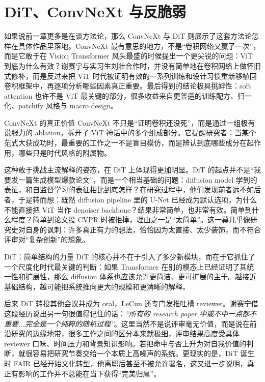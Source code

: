 \section{DiT、ConvNeXt 与反脆弱}

如果说前一章更多是在谈方法论，那么 ConvNeXt 与 DiT 则展示了这套方法论怎样在具体作品里落地。ConvNeXt 最有意思的地方，不是“卷积网络又赢了一次”，而是它敢于在 Vision Transformer 风头最盛的时候提出一个更尖锐的问题：ViT 到底为什么有效？谢赛宁与实习生刘壮合作时，并没有简单地在卷积网络上做怀旧式修补，而是反过来把 ViT 时代被证明有效的一系列训练和设计习惯重新移植回卷积框架中，再逐项分析哪些因素真正重要。最后得到的结论极具挑衅性：soft attention 也许不是 ViT 最关键的部分，很多收益来自更普适的训练配方、归一化、patchify 风格与 macro design。

\begin{knowledgebox}{ConvNeXt 的真正价值}
ConvNeXt 不只是“证明卷积还没死”，而是通过一组极有说服力的 ablation，拆开了 ViT 神话中的多个组成部分。它提醒研究者：当某个范式大获成功时，最重要的工作之一不是盲目模仿，而是辨认到底哪些成分在起作用，哪些只是时代风格的附属物。
\end{knowledgebox}

这种敢于挑战主流解释的姿态，在 DiT 上体现得更加明显。DiT 的起点并不是“我要发一篇生成模型爆款论文”，而是一个相当基础的问题：diffusion model 学到的表征，和自监督学习的表征相比到底怎样？在研究过程中，他们发现前者远不如后者，于是转而想：既然 diffusion pipeline 里的 U-Net 已经成为默认选项，为什么不能直接把 ViT 当作 denoiser backbone？结果非常简单，也非常有效。简单到什么程度？简单到论文投 CVPR 时被拒掉，理由之一是“太简单”。这一幕几乎像研究史对自身的讽刺：许多真正有力的想法，恰恰因为太直接、太少装饰，而不符合评审对“复杂创新”的想象。

\begin{importantbox}{DiT：简单结构的力量}
DiT 的核心并不在于引入了多少新模块，而在于它抓住了一个尺度化时代最关键的判断：如果 Transformer 在别的模态上已经证明了其统一性和扩展性，那么 diffusion 体系也应该允许更简洁、更可扩展的主干。越接近基础结构，越可能把系统推向更大的规模和更清晰的解释。
\end{importantbox}

后来 DiT 转投其他会议并成为 oral，LeCun 还专门发推吐槽 reviewer。谢赛宁借这段经历说出另一句很值得记住的话：\textit{``所有的 research paper 中或不中一点都不重要...完全是一个纯粹的随机过程''}。这里当然不是说评审毫无价值，而是说在前沿研究的边缘地带，很多工作之间的区分本来就极细，评审结果高度受具体 reviewer 口味、时间压力和背景知识影响。若把命中与否上升为对自我价值的判断，就很容易把研究节奏交给一个本质上高噪声的系统。更现实的是，DiT 诞生时 FAIR 已经开始文化转型，他离职后甚至不被允许署名，这又进一步说明，真正有影响的工作并不总能在当下获得“完美归属”。

